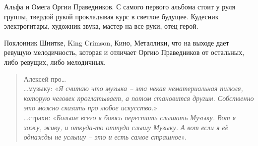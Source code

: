 Альфа и Омега Оргии Праведников. С самого первого альбома стоит у руля группы, твердой рукой прокладывая курс  в светлое будущее.
Кудесник электрогитары, художник звука, мастер на все руки, отец-герой.

Поклонник Шнитке, King Crimson, Кино, Металлики, что на выходе дает ревущую мелодичность, которая и отличает Оргию Праведников от остальных, либо ревущих, либо мелодичных.
\begin{verse}
Алексей про… \\
…музыку: «\emph{Я считаю что музыка – эта некая нематериальная пилюля, которую человек проглатывает, а потом становится другим. Собственно это можно сказать про любое искусство.}»\\
…страхи: «\emph{Больше всего я боюсь перестать слышать Музыку. Вот я хожу, живу, и откуда-то оттуда слышу Музыку. А вот если я её однажды не услышу – это и есть самое страшное}». \\
\end{verse}